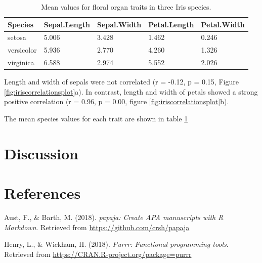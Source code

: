 \documentclass[man,floatsintext]{apa6}
\begin{document}
\begin{table}[tbp]
\begin{center}
\begin{threeparttable}
\caption{\label{tab:speciesmeanstable}Mean values for floral organ traits in three Iris species.}
\small{
\begin{tabular}{lllll}
\toprule
Species & \multicolumn{1}{c}{Sepal.Length} & \multicolumn{1}{c}{Sepal.Width} & \multicolumn{1}{c}{Petal.Length} & \multicolumn{1}{c}{Petal.Width}\\
\midrule
setosa & 5.006 & 3.428 & 1.462 & 0.246\\
versicolor & 5.936 & 2.770 & 4.260 & 1.326\\
virginica & 6.588 & 2.974 & 5.552 & 2.026\\
\bottomrule
\end{tabular}
}
\end{threeparttable}
\end{center}
\end{table}

Length and width of sepals were not correlated (r = -0.12, p = 0.15,
Figure \ref{fig:iriscorrelationsplot}a). In contrast, length and width
of petals showed a strong positive correlation (r = 0.96, p = 0.00,
figure \ref{fig:iriscorrelationsplot}b).

The mean species values for each trait are shown in table
\ref{tab:speciesmeanstable}

\hypertarget{discussion}{%
\section{Discussion}\label{discussion}}

\newpage

\hypertarget{references}{%
\section{References}\label{references}}

\begingroup
\setlength{\parindent}{-0.5in}
\setlength{\leftskip}{0.5in}

\hypertarget{refs}{}
\leavevmode\hypertarget{ref-R-papaja}{}%
Aust, F., \& Barth, M. (2018). \emph{papaja: Create APA manuscripts with
R Markdown}. Retrieved from \url{https://github.com/crsh/papaja}

\leavevmode\hypertarget{ref-R-purrr}{}%
Henry, L., \& Wickham, H. (2018). \emph{Purrr: Functional programming
tools}. Retrieved from \url{https://CRAN.R-project.org/package=purrr}
\end{document}
